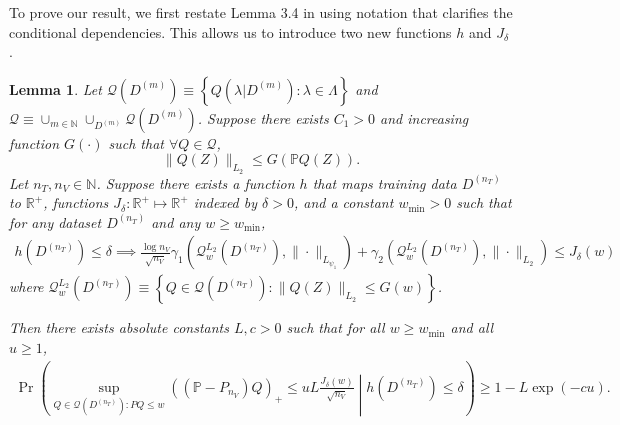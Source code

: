 \documentclass[10pt]{book}
\newtheorem{lemma}{Lemma}
\theoremstyle{definition}
\begin{document}
To prove our result, we first restate Lemma 3.4 in \citet{lecue2012oracle} using notation that clarifies the conditional dependencies.
This allows us to introduce two new functions $h$ and $J_\delta$.
\begin{lemma}
Let $\mathcal{Q}(D^{(m)})\equiv\left\{ Q(\lambda|D^{(m)}):\lambda\in\Lambda\right\} $
and $\mathcal{Q}\equiv\cup_{m\in\mathbb{N}}\cup_{D^{(m)}}\mathcal{Q}(D^{(m)})$.
Suppose there exists $C_{1}>0$ and increasing function $G(\cdot)$
such that $\forall Q\in\mathcal{Q}$, 
\[
\|Q(Z)\|_{L_{2}}\le G\left(\mathbb{P}Q(Z)\right).
\]
Let $n_{T},n_{V}\in\mathbb{N}$.
Suppose there exists a function $h$ that maps training data $D^{(n_T)}$ to $\mathbb{R}^+$,
functions $J_\delta :\mathbb{R}^+ \mapsto \mathbb{R}^+$ indexed by $\delta > 0$,
and a constant $w_{\min}>0$ such that for any dataset $D^{(n_{T})}$ and any $w \ge w_{\min}$,
\begin{align}
h(D^{(n_{T})})\le\delta\implies\frac{\log n_{V}}{\sqrt{n_{V}}}\gamma_{1}\left(\mathcal{Q}_{w}^{L_{2}}(D^{(n_{T})}),\|\cdot\|_{L_{\psi_{1}}}\right)+\gamma_{2}\left(\mathcal{Q}_{w}^{L_{2}}(D^{(n_{T})}),\|\cdot\|_{L_{2}}\right)\le J_{\delta}(w)
\end{align}
where $\mathcal{Q}_{w}^{L_{2}}(D^{(n_{T})})\equiv\left\{ Q\in\mathcal{Q}(D^{(n_{T})}):\|Q(Z)\|_{L_{2}}\le G(w)\right\}$.

Then there exists absolute constants $L,c>0$ such that for all
$w\ge w_{\min}$ and all $u\ge1$,
\begin{align}
\Pr\left(
\sup_{Q\in\mathcal{Q}(D^{(n_{T})}): PQ \le w}
\left(\left(\mathbb{P}-P_{n_{V}}\right)Q\right)_{+}
\le uL\frac{J_{\delta}(w)}{\sqrt{n_{V}}}
\middle | h\left(D^{(n_{T})}\right)
\le \delta
\right)
\ge
1-L\exp(-cu).
\end{align}
\end{lemma}
\end{document}
